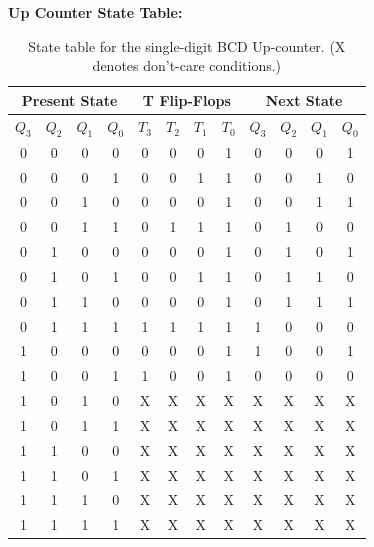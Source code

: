 \documentclass[a4paper,12pt]{article}
\begin{document}
\textbf{Up Counter State Table:}
\begin{table}[h]
\centering
\begin{tabular}{|c|c|c|c||c|c|c|c||c|c|c|c|}
\hline
\multicolumn{4}{|c||}{Present State} & \multicolumn{4}{c||}{T Flip-Flops} & \multicolumn{4}{c|}{Next State} \\
\hline
\(Q_3\) & \(Q_2\) & \(Q_1\) & \(Q_0\) & \(T_3\) & \(T_2\) & \(T_1\) & \(T_0\) & \(Q_3\) & \(Q_2\) & \(Q_1\) & \(Q_0\) \\
\hline
0 & 0 & 0 & 0 & 0 & 0 & 0 & 1 & 0 & 0 & 0 & 1 \\
\hline
0 & 0 & 0 & 1 & 0 & 0 & 1 & 1 & 0 & 0 & 1 & 0 \\
\hline
0 & 0 & 1 & 0 & 0 & 0 & 0 & 1 & 0 & 0 & 1 & 1 \\
\hline
0 & 0 & 1 & 1 & 0 & 1 & 1 & 1 & 0 & 1 & 0 & 0 \\
\hline
0 & 1 & 0 & 0 & 0 & 0 & 0 & 1 & 0 & 1 & 0 & 1 \\
\hline
0 & 1 & 0 & 1 & 0 & 0 & 1 & 1 & 0 & 1 & 1 & 0 \\
\hline
0 & 1 & 1 & 0 & 0 & 0 & 0 & 1 & 0 & 1 & 1 & 1 \\
\hline
0 & 1 & 1 & 1 & 1 & 1 & 1 & 1 & 1 & 0 & 0 & 0 \\
\hline
1 & 0 & 0 & 0 & 0 & 0 & 0 & 1 & 1 & 0 & 0 & 1 \\
\hline
1 & 0 & 0 & 1 & 1 & 0 & 0 & 1 & 0 & 0 & 0 & 0 \\
\hline
1 & 0 & 1 & 0 & X & X & X & X & X & X & X & X \\
\hline
1 & 0 & 1 & 1 & X & X & X & X & X & X & X & X \\
\hline
1 & 1 & 0 & 0 & X & X & X & X & X & X & X & X \\
\hline
1 & 1 & 0 & 1 & X & X & X & X & X & X & X & X \\
\hline
1 & 1 & 1 & 0 & X & X & X & X & X & X & X & X \\
\hline
1 & 1 & 1 & 1 & X & X & X & X & X & X & X & X \\
\hline
\end{tabular}
\caption{State table for the single-digit BCD Up-counter. (X denotes don't-care conditions.)}
\end{table}
\end{document}
